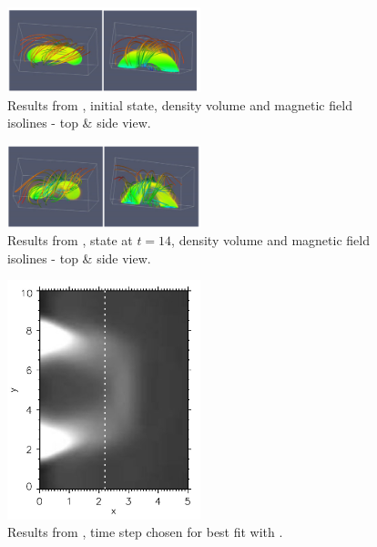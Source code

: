 \begin{figure}[H]
	\begin{center}
		\includegraphics[width=0.5\textwidth]{img/td-setup/fromHalpha-initialFD.jpg}
	\caption{Results from \cite{miraClanek}, initial state, density volume and magnetic field isolines - top \& side view.}
	\label{figure:miraResult0}
	\end{center}
\end{figure}

\begin{figure}[H]
	\begin{center}
		\includegraphics[width=0.5\textwidth]{img/td-setup/fromHalpha-14FD.jpg}
	\caption{Results from \cite{miraClanek}, state at $t = 14$, density volume and magnetic field isolines - top \& side view.}
	\label{figure:miraResult14}
	\end{center}
\end{figure}

\begin{figure}[H]
	\begin{center}
		\includegraphics[width=0.5\textwidth]{img/td-setup/fromHalphaResult.jpg}
	\caption{Results from \cite{miraClanek}, time step chosen for best fit with .}
	\label{figure:miraResultToCompare}
	\end{center}
\end{figure}

